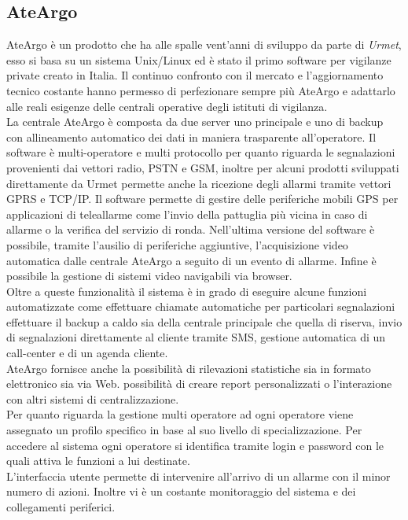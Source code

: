 \subsection{AteArgo}
AteArgo è un prodotto che ha alle spalle vent'anni di sviluppo da parte di \emph{Urmet}, esso si basa su un sistema Unix/Linux ed è stato il primo software per vigilanze private creato in Italia. Il continuo confronto con il mercato e l'aggiornamento tecnico costante hanno permesso di perfezionare sempre più AteArgo e adattarlo alle reali esigenze delle centrali operative degli istituti di vigilanza.\\
La centrale AteArgo è composta da due server uno principale e uno di backup con allineamento automatico dei dati in maniera trasparente all'operatore. Il software è multi-operatore e multi protocollo per quanto riguarda le segnalazioni provenienti dai vettori radio, PSTN e GSM, inoltre per alcuni prodotti sviluppati direttamente da Urmet permette anche la ricezione degli allarmi tramite vettori GPRS e TCP/IP. Il software permette di gestire delle periferiche mobili GPS per applicazioni di teleallarme come l'invio della pattuglia più vicina in caso di allarme o la verifica del servizio di ronda. Nell'ultima versione del software è possibile, tramite l'ausilio di periferiche aggiuntive, l'acquisizione video automatica dalle centrale AteArgo a seguito di un evento di allarme. Infine è possibile la gestione di sistemi video navigabili via browser.\\
Oltre a queste funzionalità il sistema è in grado di eseguire alcune funzioni automatizzate come effettuare chiamate automatiche per particolari segnalazioni effettuare il backup a caldo sia della centrale principale che quella di riserva, invio di segnalazioni direttamente al cliente tramite SMS, gestione automatica di un call-center e di un agenda cliente.\\
AteArgo fornisce anche la possibilità di rilevazioni statistiche sia in formato elettronico sia via Web. possibilità di creare report personalizzati o l'interazione con altri sistemi di centralizzazione.\\
Per quanto riguarda la gestione multi operatore ad ogni operatore viene assegnato un profilo specifico in base al suo livello di specializzazione. Per accedere al sistema ogni operatore si identifica tramite login e password con le quali attiva le funzioni a lui destinate.\\
L'interfaccia utente permette di intervenire all'arrivo di un allarme con il minor numero di azioni. Inoltre vi è un costante monitoraggio del sistema e dei collegamenti periferici.\\
